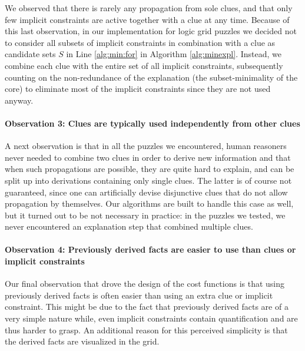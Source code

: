 We observed that there is rarely any propagation from sole clues, and that only few implicit constraints are active together with a clue at any time. 
Because of this last observation, in our implementation for logic grid puzzles we decided not to consider all subsets of implicit constraints in combination with a clue as candidate sets $S$ in Line \ref{alg:min:for} in Algorithm \ref{alg:minexpl}. Instead, we combine each clue with the entire set of all implicit constraints, subsequently counting on the non-redundance of the explanation (the subset-minimality of the core) to eliminate most of the implicit constraints since they are not used anyway. 

\paragraph{Observation 3: Clues are typically used independently from other clues} 
A next observation is that in all the puzzles we encountered, human reasoners never needed to combine two clues in order to derive new information and that when such propagations are possible, they are quite hard to explain, and can be split up into derivations containing only single clues.
The latter is of course not guaranteed, since one can artificially devise disjunctive clues that do not allow propagation by themselves. 
Our algorithms are built to handle this case as well, but it turned out to be not necessary in practice: in the puzzles we tested, we never encountered an explanation step that combined multiple clues. 

\paragraph{Observation 4: Previously derived facts are easier to use than clues or implicit constraints}\label{observation4}
Our final observation that drove the design of the cost functions is that using previously derived facts is often easier than using an extra clue or implicit constraint. This might be due to the fact that previously derived facts are of a very simple nature while, even implicit constraints contain quantification and are thus harder to grasp. An additional reason for this perceived simplicity is that the derived facts are visualized in the grid. 


